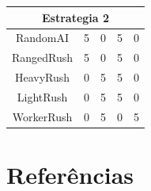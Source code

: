 \documentclass[a0,portrait]{a0poster}
\begin{document}
\begin{multicols}{2}
{\begin{center}
\begin{tabular}{|c|cc|cc|}
				\multicolumn{5}{|c|}{\textbf{Estrategia 2}}                                                                                                   \\ \hline
				RandomAI              & 5                                      & 0                 & 5                                      & 0                 \\
				RangedRush              & 5                                      & 0                 & 5                                      & 0                 \\
				HeavyRush               & 0                                      & 5                 & 5                                      & 0                 \\
				LightRush               & 0                                      & 5                 & 5                                      & 0                 \\
				WorkerRush              & 0                                      & 5                 & 0                                      & 5                 \\ \hline
			\end{tabular}
			\label{tab:resultados}
		\end{center}
	}
	
	\large
	\color{NavyBlue}
	\section*{Referências}
	\renewcommand{\section}[2]{}
	\color{Black}
	\raggedright
	
	
	
\end{multicols}
\end{document}
